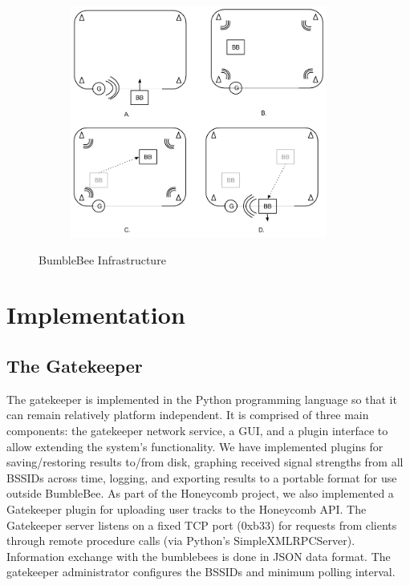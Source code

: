 \begin{figure}[htb] %
	\begin{center}
		\ \includegraphics[width=4in,height=3in]{BumbleBeeExample.png}
		\caption{BumbleBee Infrastructure}
		\label{bumblebeearch}
	\end{center}
\end{figure}


\section{Implementation}
%


\subsection{The Gatekeeper}
%

The gatekeeper is implemented in the Python programming language so that it can remain relatively platform independent. It is comprised of three main components: the gatekeeper network service, a GUI, and a plugin interface to allow extending the system's functionality. We have implemented plugins for saving/restoring results to/from disk, graphing received signal strengths from all BSSIDs across time, logging, and exporting results to a portable format for use outside BumbleBee. As part of the Honeycomb project, we also implemented a Gatekeeper plugin for uploading user tracks to the Honeycomb API. The Gatekeeper server listens on a fixed TCP port (0xb33) for requests from clients through remote procedure calls (via Python's SimpleXMLRPCServer). Information exchange with the bumblebees is done in JSON \cite{json} data format. The gatekeeper administrator configures the BSSIDs and minimum polling interval.


